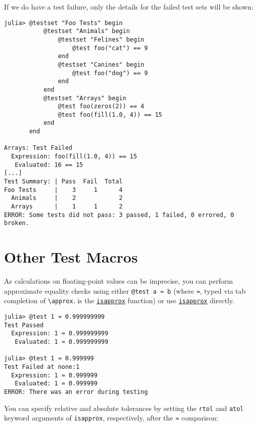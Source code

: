 If we do have a test failure, only the details for the failed test sets will be shown:




\begin{verbatim}
julia> @testset "Foo Tests" begin
           @testset "Animals" begin
               @testset "Felines" begin
                   @test foo("cat") == 9
               end
               @testset "Canines" begin
                   @test foo("dog") == 9
               end
           end
           @testset "Arrays" begin
               @test foo(zeros(2)) == 4
               @test foo(fill(1.0, 4)) == 15
           end
       end

Arrays: Test Failed
  Expression: foo(fill(1.0, 4)) == 15
   Evaluated: 16 == 15
[...]
Test Summary: | Pass  Fail  Total
Foo Tests     |    3     1      4
  Animals     |    2            2
  Arrays      |    1     1      2
ERROR: Some tests did not pass: 3 passed, 1 failed, 0 errored, 0 broken.
\end{verbatim}



\hypertarget{3398758978677734843}{}


\section{Other Test Macros}



As calculations on floating-point values can be imprecise, you can perform approximate equality checks using either \texttt{@test a ≈ b} (where \texttt{≈}, typed via tab completion of \texttt{{\textbackslash}approx}, is the \hyperlink{12499503887608197213}{\texttt{isapprox}} function) or use \hyperlink{12499503887608197213}{\texttt{isapprox}} directly.




\begin{verbatim}
julia> @test 1 ≈ 0.999999999
Test Passed
  Expression: 1 ≈ 0.999999999
   Evaluated: 1 ≈ 0.999999999

julia> @test 1 ≈ 0.999999
Test Failed at none:1
  Expression: 1 ≈ 0.999999
   Evaluated: 1 ≈ 0.999999
ERROR: There was an error during testing
\end{verbatim}



You can specify relative and absolute tolerances by setting the \texttt{rtol} and \texttt{atol} keyword arguments of \texttt{isapprox}, respectively, after the \texttt{≈} comparison:





